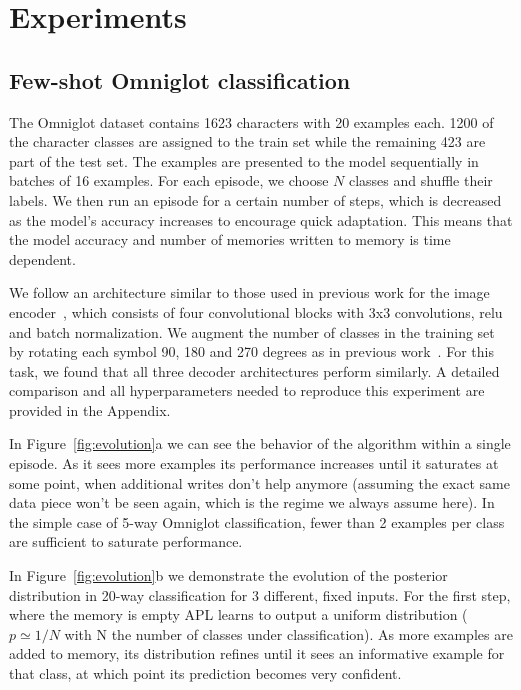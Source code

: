 \documentclass{article} \usepackage{iclr2019_conference,times}
\begin{document}
\section{Experiments}

\subsection{Few-shot Omniglot classification}

The Omniglot dataset contains 1623 characters with 20 examples each. 1200 of the character classes are assigned to the train set while the remaining 423 are part of the test set. The examples are presented to the model sequentially in batches of 16 examples. For each episode, we choose $N$ classes and shuffle their labels. We then run an episode for a certain number of steps, which is decreased as the model's accuracy increases to encourage quick adaptation. This means that the model accuracy and number of memories written to memory is time dependent.

We follow an architecture similar to those used in previous work for the image encoder~\citep{vinyals2016matching, mishra2018a}, which consists of four convolutional blocks with 3x3 convolutions, relu and batch normalization. We augment the number of classes in the training set by rotating each symbol 90, 180 and 270 degrees as in previous work~\citep{santoro2016meta}. For this task, we found that all three decoder architectures perform similarly. A detailed comparison and all hyperparameters needed to reproduce this experiment are provided in the Appendix.

In Figure~\ref{fig:evolution}a we can see the behavior of the algorithm within a single episode. As it sees more examples its performance increases until it saturates at some point, when additional writes don't help anymore (assuming the exact same data piece won't be seen again, which is the regime we always assume here). In the simple case of 5-way Omniglot classification, fewer than 2 examples per class are sufficient to saturate performance.

In Figure~\ref{fig:evolution}b we demonstrate the evolution of the posterior distribution in 20-way classification for 3 different, fixed inputs. For the first step, where the memory is empty APL learns to output a uniform distribution ($p \simeq 1/N$ with N the number of classes under classification). As more examples are added to memory, its distribution refines until it sees an informative example for that class, at which point its prediction becomes very confident. 
\end{document}
